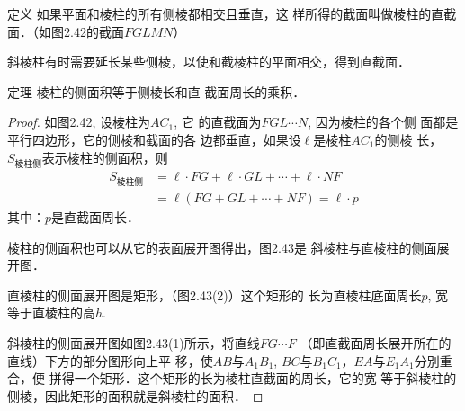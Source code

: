 \begin{blk}{定义}
    如果平面和棱柱的所有侧棱都相交且垂直，这
样所得的截面叫做棱柱的直截面．（如图2.42的截面$FGLM
N$）
\end{blk}

\begin{figure}[htp]
    \centering
{}
    \caption{}
\end{figure}


斜棱柱有时需要延长某些侧棱，以使和截棱柱的平面相交，得到直截面．

\begin{blk}{定理}
    棱柱的侧面积等于侧棱长和直
截面周长的乘积．
\end{blk}

\begin{proof}
如图2.42, 设棱柱为$AC_1$, 它
的直截面为$FGL\cdots N$, 因为棱柱的各个侧
面都是平行四边形，它的侧棱和截面的各
边都垂直，如果设$\ell$是棱柱$AC_1$的侧棱
长，$S_{\text{棱柱侧}}$表示棱柱的侧面积，则
\[\begin{split}
    S_{\text{棱柱侧}}&=\ell\cdot FG+\ell\cdot GL+\cdots+\ell\cdot NF\\
    &=\ell(FG+GL+\cdots+NF)=\ell\cdot p
\end{split}\]
其中：$p$是直截面周长．

棱柱的侧面积也可以从它的表面展开图得出，图2.43是
斜棱柱与直棱柱的侧面展开图．

直棱柱的侧面展开图是矩形，（图2.43(2)）这个矩形的
长为直棱柱底面周长$p$, 宽等于直棱柱的高$h$. 

斜棱柱的侧面展开图如图2.43(1)所示，将直线$FG\cdots F$
（即直截面周长展开所在的直线）下方的部分图形向上平
移，使$AB$与$A_1B_1$, $BC$与$B_1C_1$，$EA$与$E_1A_1$分别重合，便
拼得一个矩形．这个矩形的长为棱柱直截面的周长，它的宽
等于斜棱柱的侧棱，因此矩形的面积就是斜棱柱的面积．
\end{proof}


